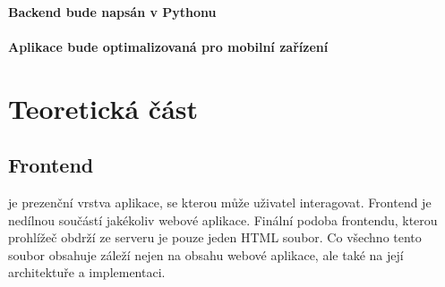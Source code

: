 \documentclass[12pt, a4paper]{article}
\begin{document}
\paragraph{Backend bude napsán v Pythonu}
\paragraph{Aplikace bude optimalizovaná pro mobilní zařízení}
\section{Teoretická část}




\subsection{Frontend}
je prezenční vrstva aplikace, se kterou může uživatel interagovat. Frontend je nedílnou součástí jakékoliv webové aplikace. Finální podoba frontendu, kterou prohlížeč obdrží ze serveru je pouze jeden HTML soubor. Co všechno tento soubor obsahuje záleží nejen na obsahu webové aplikace, ale také na její architektuře a implementaci.
\end{document}
